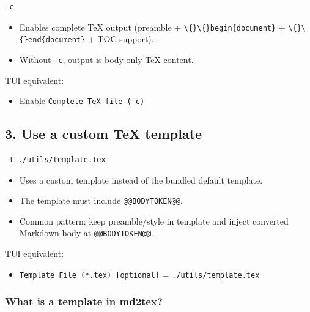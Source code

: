 \documentclass[a4paper, 12pt, twoside]{article}
\begin{document}
\begin{listing}[h!]
    \begin{verbatim}
-c
    \end{verbatim}
\end{listing}

\begin{itemize}
    \item Enables complete TeX output (preamble + \texttt{\textbackslash\{\}\textbackslash\{\}begin\{document\}} + \texttt{\textbackslash\{\}\textbackslash\{\}end\{document\}} + TOC support).
    \item Without \texttt{-c}, output is body-only TeX content.
\end{itemize}

TUI equivalent:

\begin{itemize}
    \item Enable \texttt{Complete TeX file (-c)}
\end{itemize}

\subsection*{3. Use a custom TeX template}

\begin{listing}[h!]
    \begin{verbatim}
-t ./utils/template.tex
    \end{verbatim}
\end{listing}

\begin{itemize}
    \item Uses a custom template instead of the bundled default template.
    \item The template must include \texttt{@@BODYTOKEN@@}.
    \item Common pattern: keep preamble/style in template and inject converted Markdown body at \texttt{@@BODYTOKEN@@}.
\end{itemize}

TUI equivalent:

\begin{itemize}
    \item \texttt{Template File (*.tex) [optional]} = \texttt{./utils/template.tex}
\end{itemize}

\subsubsection*{What is a template in md2tex?}
\end{document}
